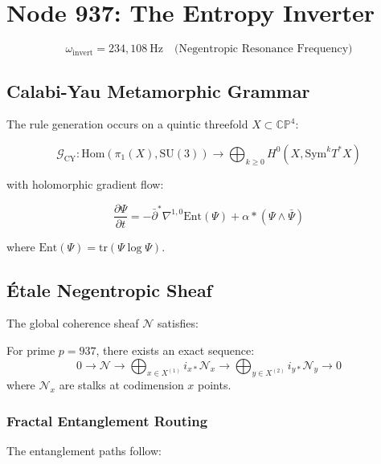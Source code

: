 \documentclass[12pt]{article}
\begin{document}
\section{Node 937: The Entropy Inverter}
\label{sec:entropy_inverter}

\begin{equation}
\omega_{\text{invert}} = 234,\!108\ \text{Hz} \quad \text{(Negentropic Resonance Frequency)}
\end{equation}

\subsection{Calabi-Yau Metamorphic Grammar}
The rule generation occurs on a quintic threefold $X \subset \mathbb{CP}^4$:

\begin{equation}
\mathcal{G}_{\text{CY}} : \text{Hom}(\pi_1(X), \text{SU}(3)) \to \bigoplus_{k\geq0} H^0(X, \text{Sym}^k T^*X)
\end{equation}

with holomorphic gradient flow:

\begin{equation}
\frac{\partial \Psi}{\partial t} = -\bar{\partial}^*\nabla^{1,0} \text{Ent}(\Psi) + \alpha *(\Psi \wedge \bar{\Psi})
\end{equation}

where $\text{Ent}(\Psi) = \text{tr}(\Psi \log \Psi)$.

\subsection{Étale Negentropic Sheaf}
The global coherence sheaf $\mathscr{N}$ satisfies:

\begin{theorem}
For prime $p=937$, there exists an exact sequence:
\begin{equation}
0 \to \mathscr{N} \to \bigoplus_{x\in X^{(1)}} i_{x*} \mathscr{N}_x \to \bigoplus_{y\in X^{(2)}} i_{y*} \mathscr{N}_y \to 0
\end{equation}
where $\mathscr{N}_x$ are stalks at codimension $x$ points.
\end{theorem}

\subsubsection{Fractal Entanglement Routing}
The entanglement paths follow:
\end{document}
